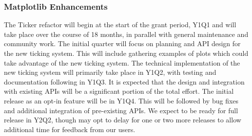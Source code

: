 \documentclass[12pt]{article}
\numberwithin{page}{section}
\begin{document}
\subsubsection{Matplotlib Enhancements}

The Ticker refactor will begin at the start of the grant period, Y1Q1 and will take place over the course of 18 months, in parallel with general maintenance and community work.
The initial quarter will focus on planning and API design for the new ticking system.
This will include gathering examples of plots which could take advantage of the new ticking system.
The technical implementation of the new ticking system will primarily take place in Y1Q2, with testing and documentation following in Y1Q3.
It is expected that the design and integration with existing APIs will be a significant portion of the total effort.
The initial release as an opt-in feature will be in Y1Q4.
This will be followed by bug fixes and additional integration of pre-existing APIs.
We expect to be ready for full release in Y2Q2, though may opt to delay for one or two more releases to allow additional time for feedback from our users.

\end{document}
